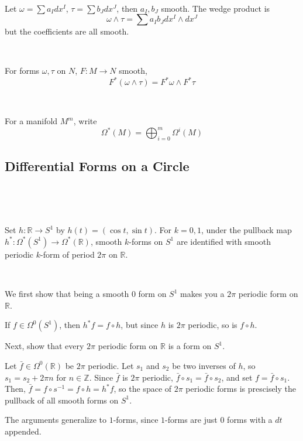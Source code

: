 \documentclass{article}
\begin{document}
\begin{customproof}
  \

  Let $\omega = \sum a_I dx^I$, $\tau = \sum b_J dx^J$, then $a_I, b_J$ smooth. The wedge product is $$\omega \wedge \tau = \sum a_Ib_J dx^I\wedge dx^J$$but the coefficients are all smooth.
\end{customproof}

\begin{proposition}
  \

  For forms $\omega, \tau$ on $N$, $F: M \to N$ smooth, $$F^*(\omega \wedge\tau) = F^*\omega \wedge F^*\tau$$
\end{proposition}

\begin{definition}
  \

  For a manifold $M^m$, write $$\Omega^*(M) = \bigoplus_{i=0}^m \Omega^i(M)$$
\end{definition}

\subsection{Differential Forms on a Circle}
\

\begin{proposition}
  \

  Set $h: \mathbb{R} \to S^1$ by $h(t) = (\cos t, \sin t)$. For $k = 0,1$, under the pullback map $h^*: \Omega^*(S^1) \to \Omega^*(\mathbb{R})$, smooth $k$-forms on $S^1$ are identified with smooth periodic $k$-form of period $2\pi$ on $\mathbb{R}$.
\end{proposition}

\begin{customproof}
  \

  We first show that being a smooth $0$ form on $S^1$ makes you a $2\pi$ periodic form on $\mathbb{R}$.

  If $f \in \Omega^0(S^1)$, then $h^*f = f \circ h$, but since $h$ is $2\pi$ periodic, so is $f \circ h$.

  Next, show that every $2\pi$ periodic form on $\mathbb{R}$ is a form on $S^1$.

  Let $\bar{f} \in \Omega^0(\mathbb{R})$ be $2\pi$ periodic. Let $s_1$ and $s_2$ be two inverses of $h$, so $s_1 = s_2 + 2\pi n$ for $n \in \mathbb{Z}$. Since $\bar{f}$ is $2\pi$ periodic, $\bar{f} \circ s_1 = \bar{f} \circ s_2$, and set $f = \bar{f} \circ s_1$. Then, $\bar{f} = f \circ s ^{-1} = f \circ h = h^*f$, so the space of $2\pi$ periodic forms is prescisely the pullback of all smooth forms on $S^1$.

  The arguments generalize to $1$-forms, since $1$-forms are just $0$ forms with a $dt$ appended.
\end{customproof}
\end{document}
